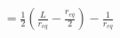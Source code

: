 \documentclass[preview]{standalone}
\begin{document}
\begin{align*}
=\frac{1}{2}\left(\frac{L}{r_{eq}}-\frac{r_{eq}}{2}\right)-\frac{1}{r_{eq}}
\end{align*}
\end{document}

